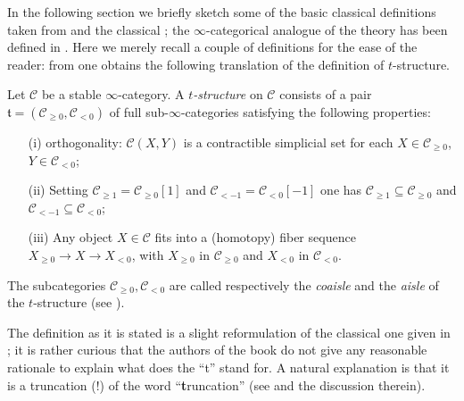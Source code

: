 \documentclass[11pt, a4paper]{amsart}
\newcommand{\tee}{\mathfrak{t}}
\renewcommand{\C}{\mathcal{C}}
\begin{document}
In the following section we briefly sketch some of the basic classical definitions taken from \cite{Kashiwara} and the classical \cite{BBDPervers}; the $\infty$-categorical analogue of the theory has been defined in \cite[\S \textbf{1.2.1}]{LurieHA}. Here we merely recall a couple of definitions for the ease of the reader: from \cite[Def. \textbf{1.2.1.1} and \textbf{1.2.1.4}]{LurieHA} one obtains the following translation of the definition of $t$-structure.
\begin{definition}\label{tistru}
Let $\C$ be a stable $\infty$-category. A \emph{$t$-structure} on $\C$ consists of a pair $\tee=(\C_{\ge 0},\C_{< 0})$ of full sub-$\infty$-categories satisfying the following properties:
\begin{itemize}
\item[(i)] orthogonality: $\C(X, Y)$ is a contractible simplicial set for each $X\in \C_{\ge 0}$, $Y\in \C_{< 0}$;
\item[(ii)] Setting $\C_{\geq 1}=\C_{\geq 0}[1]$ and $\C_{<-1}= \C_{<0}[-1]$ one has $\C_{\geq 1}\subseteq \C_{\geq 0}$ and $\C_{<-1}\subseteq \C_{<0}$;
\item[(iii)] Any object $X\in\C$ fits into a (homotopy) fiber sequence $X_{\ge 0}\to X\to X_{< 0}$, with $X_{\ge 0}$ in $\C_{\ge 0}$ and $X_{<0}$ in $\C_{< 0}$. 
\end{itemize}
The subcategories $\C_{\ge 0},\C_{< 0}$ are called respectively the \emph{coaisle} and the \emph{aisle} of the $t$-structure (see \cite{KVaisles}).
\end{definition}
\begin{remark}
The definition as it is stated is a slight reformulation of the classical one given in \cite{BBDPervers}; it is rather curious that the authors of the book do not give any reasonable rationale to explain what does the ``t'' stand for. A natural explanation is that it is a truncation (!) of the word ``\textbf{t}runcation'' (see \cite{why-call-it-t} and the discussion therein). 
\end{remark}
\end{document}
